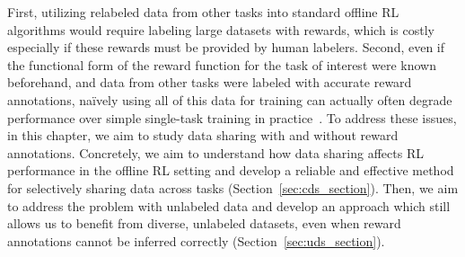 \documentclass[../thesis.tex]{subfiles}
\begin{document}
First, utilizing relabeled data from other tasks into standard offline RL algorithms would require labeling large datasets with rewards, which is costly especially if these rewards must be provided by human labelers. Second, even if the functional form of the reward function for the task of interest were known beforehand, and data from other tasks were labeled with accurate reward annotations, na\"{i}vely using all of this data for training can actually often degrade performance over simple single-task training in practice~\citep{kalashnikov2021mt}. To address these issues, in this chapter, we aim to study data sharing with and without reward annotations. Concretely, we aim to understand how data sharing affects RL performance in the offline RL setting and develop a reliable and effective method for selectively sharing data across tasks (Section~\ref{sec:cds_section}). Then, we aim to address the problem with unlabeled data and develop an approach which still allows us to benefit from diverse, unlabeled datasets, even when reward annotations cannot be inferred correctly (Section~\ref{sec:uds_section}). 




\iffalse
\end{document}
